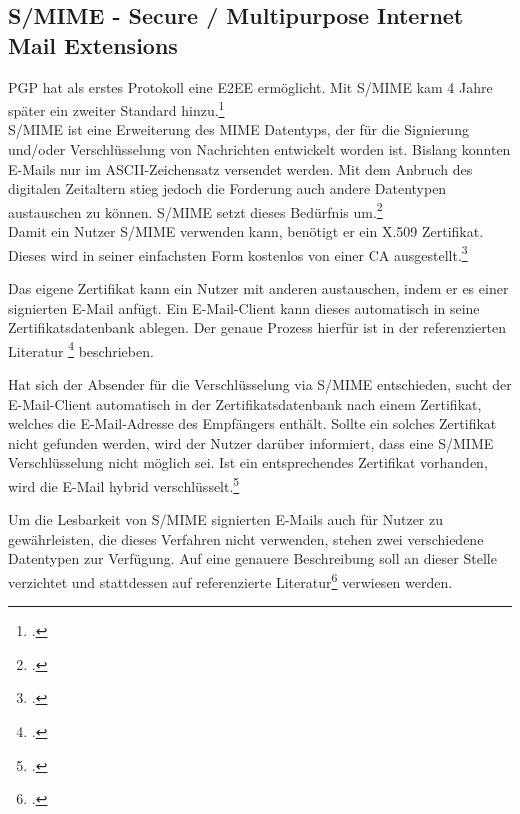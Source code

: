 \documentclass  [paper=a4,
				fontsize=12pt,
				listof=totoc,
				bibliography=totoc
				]{scrreprt}
\begin{document}
	
			\subsection{S/MIME - Secure / Multipurpose Internet Mail Extensions}
			
				\ac{PGP} hat als erstes Protokoll eine \ac{E2EE} ermöglicht. Mit \ac{S/MIME} kam 4 Jahre später ein zweiter Standard hinzu.\footcite[Vgl.][]{Duevel}
				\medskip\\	
				\ac{S/MIME} ist eine Erweiterung des MIME Datentyps, der für die Signierung und/oder Verschlüsselung von Nachrichten entwickelt worden ist.
				Bislang konnten E-Mails nur im ASCII-Zeichensatz versendet werden. Mit dem Anbruch des digitalen Zeitaltern stieg jedoch die Forderung auch andere Datentypen austauschen zu können. \ac{S/MIME} setzt dieses Bedürfnis um.\footcite[Vgl.][S. 57-60]{Schwenk}
				\medskip\\
				Damit ein Nutzer \ac{S/MIME} verwenden kann, benötigt er ein X.509 Zertifikat. Dieses wird in seiner einfachsten Form kostenlos von einer \ac{CA} ausgestellt.\footcite[Vgl.][]{Duevel}
				
				Das eigene Zertifikat kann ein Nutzer mit anderen austauschen, indem er es einer signierten E-Mail anfügt. Ein E-Mail-Client kann dieses automatisch in seine Zertifikatsdatenbank ablegen. Der genaue Prozess hierfür ist in der referenzierten Literatur \footcite[Vgl.][S. 65 ff.]{Schwenk} beschrieben.
				\medskip
														
				Hat sich der Absender für die Verschlüsselung via \ac{S/MIME} entschieden, sucht der E-Mail-Client automatisch in der Zertifikatsdatenbank nach einem Zertifikat, welches die E-Mail-Adresse des Empfängers enthält. Sollte ein solches Zertifikat nicht gefunden werden, wird der Nutzer darüber informiert, dass eine \ac{S/MIME} Verschlüsselung nicht möglich sei. Ist ein entsprechendes Zertifikat vorhanden, wird die E-Mail hybrid verschlüsselt.\footcite[Vgl.][S. 65]{Schwenk}
				
				
				Um die Lesbarkeit von \ac{S/MIME} signierten E-Mails auch für Nutzer zu gewährleisten, die dieses Verfahren nicht verwenden, stehen zwei verschiedene Datentypen zur Verfügung. Auf eine genauere Beschreibung soll an dieser Stelle verzichtet und stattdessen auf referenzierte Literatur\footcite[Vgl.][S. 65]{Schwenk} verwiesen werden.
				\medskip
\end{document}
